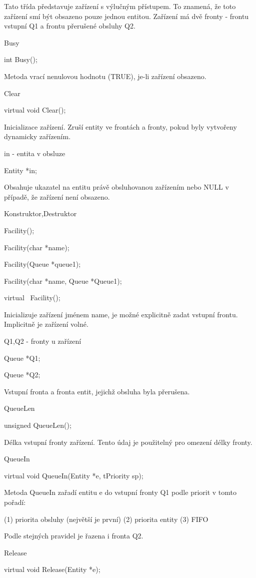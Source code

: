 \documentclass[a4paper]{article}
\begin{document}
Tato třída představuje zařízení s výlučným přístupem. To znamená,
že toto zařízení smí být obsazeno pouze jednou entitou. Zařízení
má dvě fronty - frontu vstupní Q1 a frontu přerušené obsluhy
Q2.


Busy

  int Busy();


Metoda vrací nenulovou hodnotu (TRUE), je-li zařízení obsazeno.


Clear

  virtual void Clear();


Inicializace zařízení. Zruší entity ve frontách a fronty, pokud byly
vytvořeny dynamicky zařízením.


in - entita v obsluze

  Entity *in;


Obsahuje ukazatel na entitu právě obsluhovanou zařízením nebo NULL
v případě, že zařízení není obsazeno.


Konstruktor,Destruktor

  Facility();

  Facility(char *name);

  Facility(Queue *queue1);

  Facility(char *name, Queue *Queue1);

  virtual ~Facility();


Inicializuje zařízení jménem name, je možné explicitně zadat
vstupní frontu. Implicitně je zařízení volné.


Q1,Q2 - fronty u zařízení

  Queue *Q1;

  Queue *Q2;


Vstupní fronta a fronta entit, jejichž obsluha byla přerušena.


QueueLen

  unsigned QueueLen();


Délka vstupní fronty zařízení. Tento údaj je použitelný pro omezení
délky fronty.


QueueIn

  virtual void QueueIn(Entity *e, tPriority sp);


Metoda QueueIn zařadí entitu e do vstupní fronty
Q1 podle priorit v tomto pořadí:

 (1) priorita obsluhy (největší je první)
 (2) priorita entity
 (3) FIFO


Podle stejných pravidel je řazena i fronta Q2.


Release

  virtual void Release(Entity *e);
\end{document}
